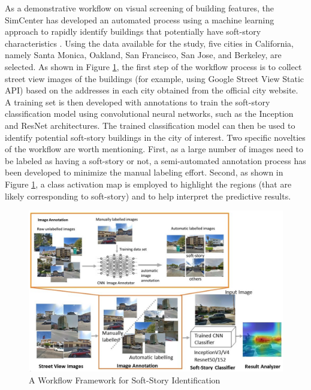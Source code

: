 As a demonstrative workflow on visual screening of building features, the SimCenter has developed an automated process using a machine learning approach to rapidly identify buildings that potentially have soft-story characteristics \citep{yu2019building,yu2020largescale}. Using the data available for the study, five cities in California, namely Santa Monica, Oakland, San Francisco, San Jose, and Berkeley, are selected. As shown in Figure \ref{fig:soft_story_identification}, the first step of the workflow process is to collect street view images of the buildings (for example, using Google Street View Static API) based on the addresses in each city obtained from the official city website. A training set is then developed with annotations to train the soft-story classification model using convolutional neural networks, such as the Inception \citep{szegedy2016rethinking,szegedy2017inceptionv4} and ResNet \citep{he2016deep} architectures. The trained classification model can then be used to identify potential soft-story buildings in the city of interest. Two specific novelties of the workflow are worth mentioning. First, as a large number of images need to be labeled as having a soft-story or not, a semi-automated annotation process has been developed to minimize the manual labeling effort. Second, as shown in Figure \ref{fig:soft_story_identification}, a class activation map \citep{zhou2016} is employed to highlight the regions (that are likely corresponding to soft-story) and to help interpret the predictive results.

\begin{figure}[htb]
    \centering
    \includegraphics[width=1.0\textwidth, angle = 0]{Figures/soft_story_identification.png}
    \caption{A Workflow Framework for Soft-Story Identification}
    \label{fig:soft_story_identification}
\end{figure}


